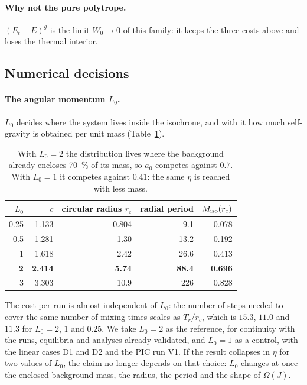 \documentclass[11pt,a4paper]{article}
\begin{document}
\paragraph{Why not the pure polytrope.} $(E_t-E)^g$ is the limit $W_0\to0$ of this family: it
keeps the three costs above and loses the thermal interior.

\subsection{Numerical decisions}
\label{sec:numerico}

\paragraph{The angular momentum $L_0$.}
\label{sec:L0}
$L_0$ decides where the system lives inside the isochrone, and with it how much
self-gravity is obtained per unit mass (Table~\ref{tab:L0}).

\begin{table}[!htbp]
\centering
\begin{tabular}{rrrrr}
\toprule
$L_0$ & $c$ & circular radius $r_c$ & radial period & $M_{\rm iso}(r_c)$ \\
\midrule
0.25 & 1.133 & 0.804 & 9.1 & 0.078\\
0.5 & 1.281 & 1.30 & 13.2 & 0.192\\
1 & 1.618 & 2.42 & 26.6 & 0.413\\
\textbf{2} & \textbf{2.414} & \textbf{5.74} & \textbf{88.4} & \textbf{0.696}\\
3 & 3.303 & 10.9 & 226 & 0.828\\
\bottomrule
\end{tabular}
\caption{With $L_0=2$ the distribution lives where the background already encloses
\SI{70}{\%} of its mass, so $a_0$ competes against $0.7$. With $L_0=1$ it competes against $0.41$:
the same $\eta$ is reached with less mass.}
\label{tab:L0}
\end{table}

The cost per run is almost independent of $L_0$: the number of steps needed to cover the
same number of mixing times scales as $T_r/r_c$, which is $15.3$, $11.0$ and $11.3$ for
$L_0=2$, $1$ and $0.25$. We take $L_0=2$ as the reference, for continuity with the runs,
equilibria and analyses already validated, and $L_0=1$ as a control, with the linear cases
D1 and D2 and the PIC run V1. If the result collapses in $\eta$ for two values of $L_0$, the
claim no longer depends on that choice: $L_0$ changes at once the enclosed background mass,
the radius, the period and the shape of $\Omega(J)$.
\end{document}
